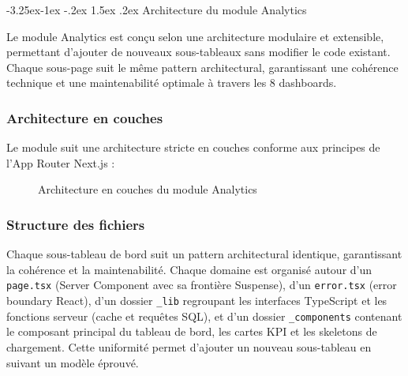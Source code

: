 \documentclass[12pt,a4paper,openany]{report}
\makeatletter
\renewcommand\subsection{\@startsection{subsection}{2}{\z@}%
  {-3.25ex\@plus -1ex \@minus -.2ex}%
  {1.5ex \@plus .2ex}%
  {\needspace{8\baselineskip}\normalfont\large\bfseries\color{primary!80!black}}}
\newcommand{\code}[1]{\texttt{#1}}
\makeatother
\begin{document}
\subsection{Architecture du module Analytics}

Le module Analytics est conçu selon une architecture modulaire et extensible, permettant d'ajouter de nouveaux sous-tableaux sans modifier le code existant. Chaque sous-page suit le même pattern architectural, garantissant une cohérence technique et une maintenabilité optimale à travers les 8 dashboards.

\subsubsection{Architecture en couches}

Le module suit une architecture stricte en couches conforme aux principes de l'App Router Next.js :

\begin{figure}[H]
\centering
{}
\caption{Architecture en couches du module Analytics}
\end{figure}

\subsubsection{Structure des fichiers}

Chaque sous-tableau de bord suit un pattern architectural identique, garantissant la cohérence et la maintenabilité. Chaque domaine est organisé autour d'un \code{page.tsx} (Server Component avec sa frontière Suspense), d'un \code{error.tsx} (error boundary React), d'un dossier \code{\_lib} regroupant les interfaces TypeScript et les fonctions serveur (cache et requêtes SQL), et d'un dossier \code{\_components} contenant le composant principal du tableau de bord, les cartes KPI et les skeletons de chargement. Cette uniformité permet d'ajouter un nouveau sous-tableau en suivant un modèle éprouvé.
\end{document}

